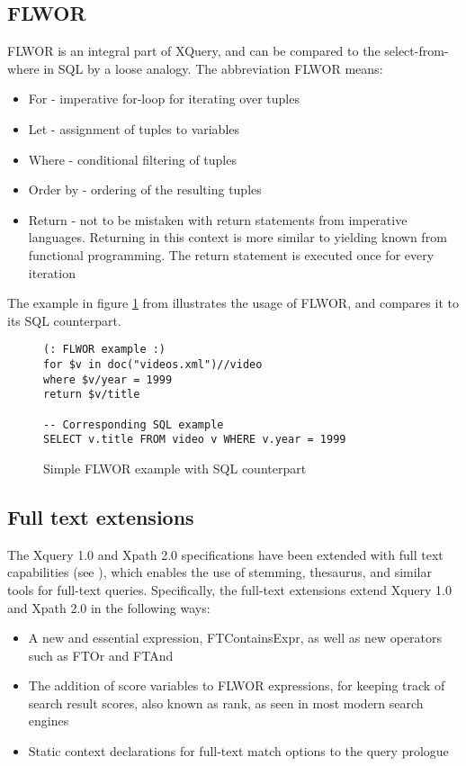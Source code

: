 \subsection{FLWOR}
FLWOR is an integral part of XQuery, and can be compared to the
select-from-where in SQL by a loose analogy. The abbreviation FLWOR means:
\begin{itemize}
\item For - imperative for-loop for iterating over tuples
\item Let - assignment of tuples to variables
\item Where - conditional filtering of tuples
\item Order by - ordering of the resulting tuples
\item Return - not to be mistaken with return statements from imperative
languages. Returning in this context is more similar to yielding known from
functional programming. The return statement is executed once for every
iteration   
\end{itemize}
The example in figure \ref{code:theory:flwor} from \cite{styl00} illustrates
the usage of FLWOR, and  compares it to its SQL counterpart.
\begin{figure}
\begin{Verbatim}
(: FLWOR example :)
for $v in doc("videos.xml")//video
where $v/year = 1999
return $v/title

-- Corresponding SQL example 
SELECT v.title FROM video v WHERE v.year = 1999
\end{Verbatim}
\caption[Simple FLWOR example]{Simple FLWOR example with SQL counterpart}
\label{code:theory:flwor}
\end{figure}

\subsection{Full text extensions}
The Xquery 1.0  and Xpath 2.0 specifications have been extended with full text
capabilities (see \cite{w3c02}), which enables the use of stemming, thesaurus,
and similar tools for full-text queries. Specifically, the full-text extensions
extend Xquery 1.0 and Xpath 2.0 in the following ways:
\begin{itemize}
\item A new and essential expression, FTContainsExpr, as well as new operators
such as FTOr and FTAnd 
\item The addition of score variables to FLWOR expressions, for keeping track
of search result scores, also known as rank, as seen in most modern search
engines 
\item Static context declarations for full-text match options to the query
prologue 
\end{itemize}

